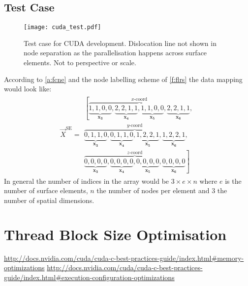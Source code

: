 	\subsection{Test Case}
	\begin{figure}
		\texttt{[image: cuda\_test.pdf]}
		\caption[Test case for CUDA development.]{Test case for CUDA development. Dislocation line not shown in node separation as the parallelisation happens across surface elements. Not to perspective or scale.}
		\label{f:cuda_test}
	\end{figure}
	According to \cref{a:fcne} and the node labelling scheme of \cref{f:flrs} the data mapping would look like:
	\begin{align}\label{e:cuda_test}
		\vec{X}^{\textrm{SE}} = 
		\begin{split}
			\left[\overbrace{\underbrace{1,1,0,0}_{\mathbf{x_{3}}}, \underbrace{2,2,1,1}_{\mathbf{x_{4}}},
				\underbrace{1,1,0,0}_{\mathbf{x_{5}}}, \underbrace{2,2,1,1}_{\mathbf{x_{6}}}}^{x\textrm{-coord}},\right.\\
			\overbrace{\underbrace{0,1,1,0}_{\mathbf{x_{3}}}, \underbrace{0,1,1,0}_{\mathbf{x_{4}}},
				\underbrace{1,2,2,1}_{\mathbf{x_{5}}}, \underbrace{1,2,2,1}_{\mathbf{x_{6}}}}^{y\textrm{-coord}},\\
			\left.\overbrace{\underbrace{0,0,0,0}_{\mathbf{x_{3}}}, \underbrace{0,0,0,0}_{\mathbf{x_{4}}},
				\underbrace{0,0,0,0}_{\mathbf{x_{5}}}, \underbrace{0,0,0,0}_{\mathbf{x_{6}}}}^{z\textrm{-coord}}\right]
		\end{split}
	\end{align}
	In general the number of indices in the array would be $ 3 \times e \times n $ where $ e $ is the number of surface elements, $ n $ the number of nodes per element and 3 the number of spatial dimensions.
	\section{Thread Block Size Optimisation}
	\href{http://docs.nvidia.com/cuda/cuda-c-best-practices-guide/index.html#memory-optimizations}{http://docs.nvidia.com/cuda/cuda-c-best-practices-guide/index.html\#memory-optimizations}
	\href{http://docs.nvidia.com/cuda/cuda-c-best-practices-guide/index.html#execution-configuration-optimizations}{http://docs.nvidia.com/cuda/cuda-c-best-practices-guide/index.html\#execution-configuration-optimizations}
	\savearabiccounter